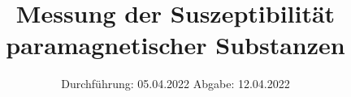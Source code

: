 

\subject{V 606}
\title{Messung der Suszeptibilität paramagnetischer Substanzen}
\date{%
  Durchführung: 05.04.2022
  \hspace{3em}
  Abgabe: 12.04.2022
}



\maketitle
\thispagestyle{empty}
\tableofcontents
\newpage







\printbibliography{}


